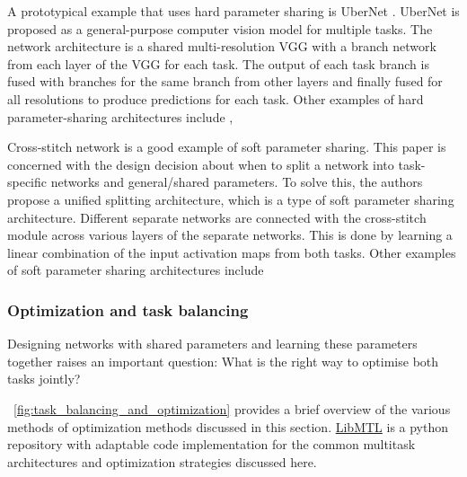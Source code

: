 \documentclass[times,twocolumn,final]{elsarticle}
\newcommand{\figref}[1]{\figurename~\ref{#1}}
\begin{document}
A prototypical example that uses hard parameter sharing is UberNet \citep{ubernet}. UberNet is proposed as a general-purpose computer vision model for multiple tasks. The network architecture is a shared multi-resolution VGG \citep{vgg} with a branch network from each layer of the VGG for each task. The output of each task branch is fused with branches for the same branch from other layers and finally fused for all resolutions to produce predictions for each task. 
Other examples of hard parameter-sharing architectures include  \citep{Xu_2018_CVPR,multinet,multitaskcenternet,MTAN,Zhang_2018_ECCV}, 


Cross-stitch network \citep{Misra_2016_CVPR} is a good example of soft parameter sharing. This paper is concerned with the design decision about when to split a network into task-specific networks and general/shared parameters. To solve this, the authors propose a unified splitting architecture, which is a type of soft parameter sharing architecture. Different separate networks are connected with the cross-stitch module across various layers of the separate networks. This is done by learning a linear combination of the input activation maps from both tasks. Other examples of soft parameter sharing architectures include \citep{gao2019nddr,ruder2019latent} 


\subsubsection{Optimization and task balancing} \label{subsec::optimization_and_task_balancing}
Designing networks with shared parameters and learning these parameters together raises an important question: What is the right way to optimise both tasks jointly?

\figref{fig:task_balancing_and_optimization} provides a brief overview of the various methods of optimization methods discussed in this section. \href{https://github.com/median-research-group/LibMTL}{LibMTL}\citep{lin2023libmtl} is a python repository with adaptable code implementation for the common multitask architectures and optimization strategies discussed here.
\end{document}
